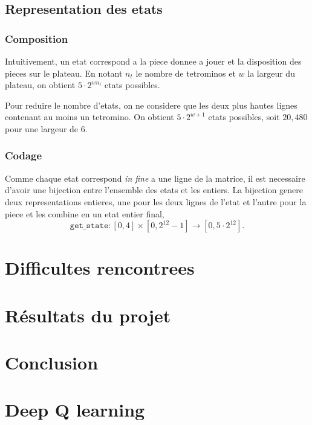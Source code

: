 \documentclass{article}
\begin{document}
\subsection{Representation des etats}
\subsubsection{Composition}
Intuitivement, un etat correspond a la piece donnee a jouer et la disposition
des pieces sur le plateau. En notant \(n_t\) le nombre de tetrominos et \(w\) la
largeur du plateau, on obtient \(5 \cdot 2^{wn_t}\) etats possibles.

Pour reduire le nombre d'etats, on ne considere que les deux plus hautes lignes
contenant au moins un tetromino. On obtient \(5\cdot 2^{w+1}\) etats possibles,
soit \(20,480\) pour une largeur de 6.

\subsubsection{Codage}
Comme chaque etat correspond \textit{in fine} a une ligne de la matrice, il est
necessaire d'avoir une bijection entre l'ensemble des etats et les entiers. La
bijection genere deux representations entieres, une pour les deux lignes de
l'etat et l'autre pour la piece et les combine en un etat entier final,
\[
  \texttt{get\_state}\colon [0,4]\times [0, 2^{12} - 1] \to [0, 5\cdot 2^{12}].
\]

\section{Difficultes rencontrees}

\section{R\'esultats du projet}

\section*{Conclusion}

\appendix
\section{Deep Q learning}
\end{document}
